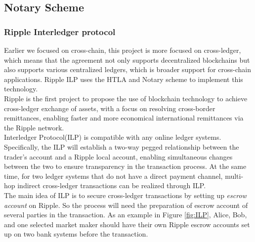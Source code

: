 \subsection{Notary Scheme}
\label{sec:notary}
\subsubsection{Ripple Interledger protocol}
\noindent Earlier we focused on cross-chain, this project is more focused on cross-ledger, which means that the agreement not only supports decentralized blockchains but also supports various centralized ledgers, which is broader support for cross-chain applications. Ripple ILP\cite{thomas2015protocol} uses the HTLA and Notary scheme to implement this technology.\\
\noindent Ripple is the first project to propose the use of blockchain technology to achieve cross-ledger exchange of assets, with a focus on resolving cross-border remittances, enabling faster and more economical international remittances via the Ripple network.\\
\noindent Interledger Protocol(ILP) is compatible with any online ledger systems. Specifically, the ILP will establish a two-way pegged relationship between the trader's account and a Ripple local account, enabling simultaneous changes between the two to ensure transparency in the transaction process. At the same time, for two ledger systems that do not have a direct payment channel, multi-hop indirect cross-ledger transactions can be realized through ILP. \\
\noindent The main idea of ILP is to secure cross-ledger transactions by setting up \textit{escrow account} on Ripple. So the process will need the preparation of escrow account of several parties in the transaction. As an example in Figure \ref{fig:ILP}, Alice, Bob, and one selected market maker should have their own Ripple escrow accounts set up on two bank systems before the transaction. \\
